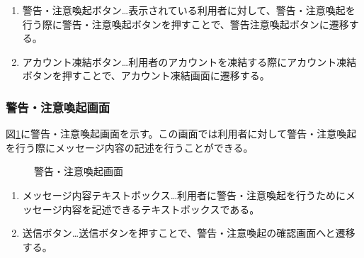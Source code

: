 \documentclass[a4j]{jarticle}
\begin{document}
\begin{enumerate}
  \renewcommand{\labelenumi}{\textcircled{\scriptsize \theenumi}}

\item 警告・注意喚起ボタン…表示されている利用者に対して、警告・注意喚起を行う際に警告・注意喚起ボタンを押すことで、警告注意喚起ボタンに遷移する。
\item アカウント凍結ボタン…利用者のアカウントを凍結する際にアカウント凍結ボタンを押すことで、アカウント凍結画面に遷移する。

\end{enumerate}

\subsubsection{警告・注意喚起画面}
図\ref{fig:report_admin}に警告・注意喚起画面を示す。この画面では利用者に対して警告・注意喚起を行う際にメッセージ内容の記述を行うことができる。

\begin{figure}[H]
\centering
{}
\caption{警告・注意喚起画面}
\label{fig:report_admin}
\end{figure}

\begin{enumerate}
  \renewcommand{\labelenumi}{\textcircled{\scriptsize \theenumi}}

\item メッセージ内容テキストボックス…利用者に警告・注意喚起を行うためにメッセージ内容を記述できるテキストボックスである。
\item 送信ボタン…送信ボタンを押すことで、警告・注意喚起の確認画面へと遷移する。
\end{enumerate}
\end{document}
